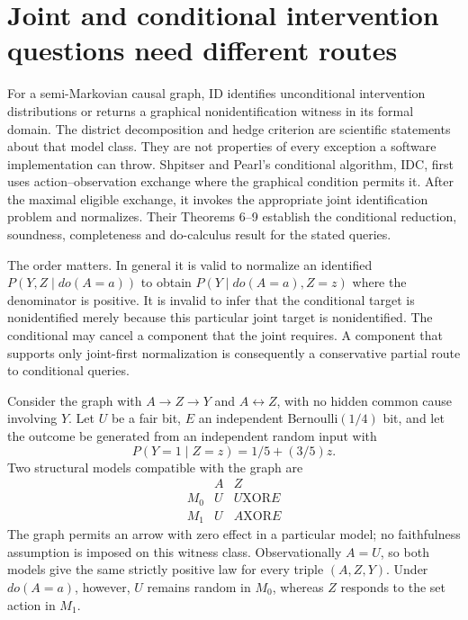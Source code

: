 \section{Joint and conditional intervention questions need different routes}
\label{exec17:s3-idc}

For a semi-Markovian causal graph, ID identifies unconditional
intervention distributions or returns a graphical nonidentification
witness in its formal domain. The district decomposition and hedge
criterion are scientific statements about that model class.
They are not properties of every exception a software implementation
can throw. Shpitser and Pearl's conditional algorithm, IDC, first
uses action--observation exchange where the graphical condition permits
it. After the maximal eligible exchange, it invokes the appropriate
joint identification problem and normalizes. Their Theorems 6--9
establish the conditional reduction, soundness, completeness and
do-calculus result for the stated
queries.~\citep{id2006}

The order matters. In general it is valid to normalize an identified
$P(Y,Z\mid do(A=a))$ to obtain $P(Y\mid do(A=a),Z=z)$
where the denominator is positive. It is invalid to infer that
the conditional target is nonidentified merely because this particular
joint target is nonidentified. The conditional may cancel a component
that the joint requires. A component that supports only joint-first
normalization is consequently a conservative partial route to
conditional queries.

Consider the graph with $A\to Z\to Y$ and $A\leftrightarrow Z$,
with no hidden common cause involving $Y$. Let $U$ be a fair bit,
$E$ an independent Bernoulli$(1/4)$ bit, and let the outcome be generated
from an independent random input with
\[
 P(Y=1\mid Z=z)=1/5+(3/5)z.
\]
Two structural models compatible with the graph are
\[
\begin{array}{c|cc}
 & A&Z\\ \hline
 M_0&U&U\mathbin{\mathrm{XOR}}E\\
 M_1&U&A\mathbin{\mathrm{XOR}}E
\end{array}
\]
The graph permits an arrow with zero effect in a particular model;
no faithfulness assumption is imposed on this witness class.
Observationally $A=U$, so both models give the same strictly positive
law for every triple $(A,Z,Y)$. Under $do(A=a)$, however, $U$ remains
random in $M_0$, whereas $Z$ responds to the set action in
$M_1$.~\citep{exec17_s3_exact}

